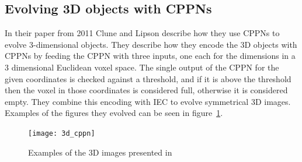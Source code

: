 \subsection{Evolving 3D objects with CPPNs}
In their paper from 2011 Clune and Lipson describe how they use CPPNs to evolve 
3-dimensional objects\cite{Clune:2011:EOG:2078245.2078246}.
They describe how they encode the 3D objects with CPPNs by feeding the CPPN 
with three inputs, one each for the dimensions in a 3 dimensional Euclidean
voxel space.
The single output of the CPPN for the given coordinates is checked against a
threshold, and if it is above the threshold then the voxel in those coordinates
is considered full, otherwise it is considered
empty\cite[p.~5]{Clune:2011:EOG:2078245.2078246}. They combine this encoding
with IEC to evolve symmetrical 3D images. Examples of the figures they evolved
can be seen in figure~\ref{fig:3dobjects}.
\begin{figure}[ht]
\centering
\texttt{[image: 3d\_cppn]}
\caption{Examples of the 3D images presented in 
\cite{Clune:2011:EOG:2078245.2078246}}
\label{fig:3dobjects}
\end{figure}

